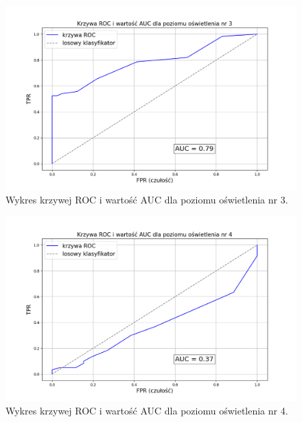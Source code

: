 \begin{figure}[H]
    \centering
    \includegraphics[width=\linewidth]{r_test_dokładności/AUC_charts/3.png}
    \caption{Wykres krzywej ROC i wartość AUC dla poziomu oświetlenia nr 3.}
    \label{fig:ROC-3}
\end{figure}

\begin{figure}[H]
    \centering
    \includegraphics[width=\linewidth]{r_test_dokładności/AUC_charts/4.png}
    \caption{Wykres krzywej ROC i wartość AUC dla poziomu oświetlenia nr 4.}
    \label{fig:ROC-4}
\end{figure}

